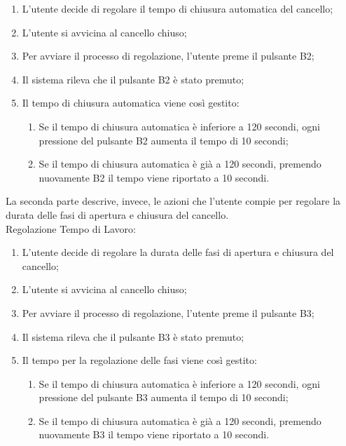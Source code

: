 \begin{enumerate}
    \item L’utente decide di regolare il tempo di chiusura automatica del cancello;
    \item L’utente si avvicina al cancello chiuso;
    \item Per avviare il processo di regolazione, l’utente preme il pulsante B2;
    \item Il sistema rileva che il pulsante B2 è stato premuto;
    \item Il tempo di chiusura automatica viene così gestito:
    
    \begin{enumerate}
        \item Se il tempo di chiusura automatica è inferiore a 120 secondi, ogni pressione del pulsante B2 aumenta il tempo di 10 secondi;
        \item Se il tempo di chiusura automatica è già a 120 secondi, premendo nuovamente B2 il tempo viene riportato a 10 secondi. \\
    \end{enumerate}
\end{enumerate}

La seconda parte descrive, invece, le azioni che l’utente compie per regolare la durata delle fasi di apertura e chiusura del cancello. \\

\noindent Regolazione Tempo di Lavoro:

\begin{enumerate}
    \item L’utente decide di regolare la durata delle fasi di apertura e chiusura del cancello;
    \item L’utente si avvicina al cancello chiuso;
    \item Per avviare il processo di regolazione, l’utente preme il pulsante B3;
    \item Il sistema rileva che il pulsante B3 è stato premuto;
    \item Il tempo per la regolazione delle fasi viene così gestito:
    \begin{enumerate}
        \item Se il tempo di chiusura automatica è inferiore a 120 secondi, ogni pressione del pulsante B3 aumenta il tempo di 10 secondi;
        \item Se il tempo di chiusura automatica è già a 120 secondi, premendo nuovamente B3 il tempo viene riportato a 10 secondi. \\
    \end{enumerate}
\end{enumerate}


